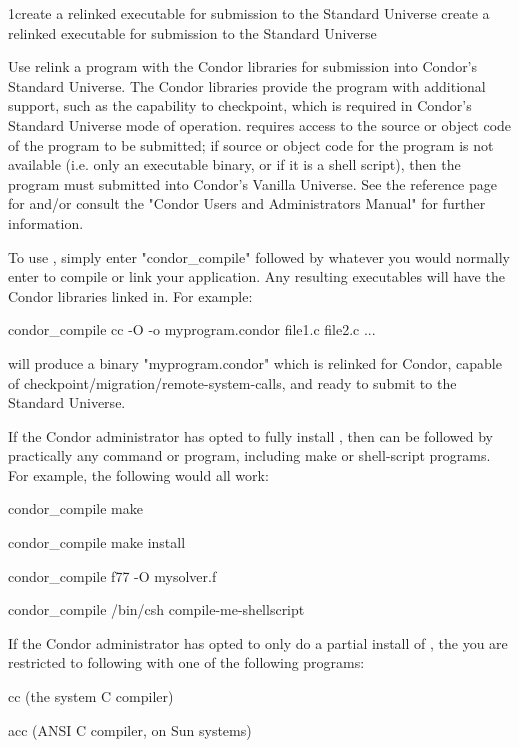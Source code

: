 \begin{ManPage}{}{1}{create a relinked executable for submission to the Standard Universe create a relinked executable for submission to the Standard Universe} 
\label{man-condor-compile}
\Synopsis {}

\Description
Use  relink a program with the Condor libraries for submission into Condor's Standard Universe. The
Condor libraries provide the program with additional support, such as the capability to checkpoint, which is required in
Condor's Standard Universe mode of operation.  requires access to the source or object code of the
program to be submitted; if source or object code for the program is not available (i.e. only an executable binary, or if it is a
shell script), then the program must submitted into Condor's Vanilla Universe. See the reference page for 
and/or consult the "Condor Users and Administrators Manual" for further information. 

To use , simply enter "condor\_compile" followed by whatever you would normally enter to compile or link
your application. Any resulting executables will have the Condor libraries linked in. For example: 

condor\_compile cc -O -o myprogram.condor file1.c file2.c ... 

will produce a binary "myprogram.condor" which is relinked for Condor, capable of
checkpoint/migration/remote-system-calls, and ready to submit to the Standard Universe. 

If the Condor administrator has opted to fully install , then  can be followed by practically any
command or program, including make or shell-script programs. For example, the following would all work: 

condor\_compile make 

condor\_compile make install 

condor\_compile f77 -O mysolver.f 

condor\_compile /bin/csh compile-me-shellscript 

If the Condor administrator has opted to only do a partial install of , the you are restricted to following
 with one of the following programs: 

     cc (the system C compiler) 

     acc (ANSI C compiler, on Sun systems) 


\end{ManPage}
